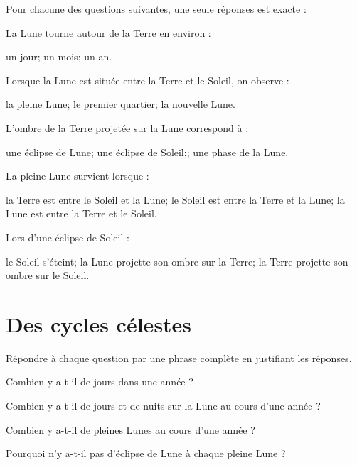 \documentclass[a4paper,11pt]{exam}
\begin{document}
Pour chacune des questions suivantes, une seule réponses est exacte :
\begin{questions}
	\question[1] La Lune tourne autour de la Terre en environ :
		\begin{oneparcheckboxes}
			\choice un jour;
			\correctchoice un mois;
			\choice un an.
		\end{oneparcheckboxes}

	\question[1] Lorsque la Lune est située entre la Terre et le Soleil, on observe :
	\begin{oneparcheckboxes}
		\choice la pleine Lune;
		\choice le premier quartier;
		\correctchoice la nouvelle Lune.
	\end{oneparcheckboxes}

	\question[1] L'ombre de la Terre projetée sur la Lune correspond à :
	\begin{oneparcheckboxes}
		\correctchoice une éclipse de Lune;
		\choice une éclipse de Soleil;;
		\choice une phase de la Lune.		
	\end{oneparcheckboxes}

	\question[1] La pleine Lune survient lorsque :
	\begin{oneparcheckboxes}
		\correctchoice la Terre est entre le Soleil et la Lune;
		\choice le Soleil est entre la Terre et la Lune;
		\choice la Lune est entre la Terre et le Soleil.		
	\end{oneparcheckboxes}

	\question[1] Lors d'une éclipse de Soleil :
	\begin{oneparcheckboxes}
		\choice le Soleil s'éteint;
		\choice la Lune projette son ombre sur la Terre;
		\correctchoice la Terre projette son ombre sur le Soleil.
	\end{oneparcheckboxes}
\end{questions}




\section{Des cycles célestes}

Répondre à chaque question par une phrase complète en justifiant les réponses.
\begin{questions}
	\question[2] Combien y a-t-il de jours dans une année ?
	\fillwithdottedlines{3cm}
	
	\question[2] Combien y a-t-il de jours et de nuits sur la Lune au cours d'une année ?
	\fillwithdottedlines{4cm}
	
	\question[2] Combien y a-t-il de pleines Lunes au cours d'une année ?
	\fillwithdottedlines{4cm}
	
	\question[2] Pourquoi n'y a-t-il pas d'éclipse de Lune à chaque pleine Lune ?
	\fillwithdottedlines{4cm}
\end{questions}
\end{document}
